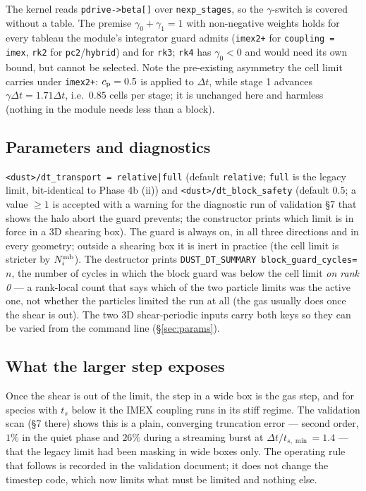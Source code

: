 \documentclass[11pt]{article}
\newcommand{\code}[1]{\texttt{#1}}
\begin{document}
The kernel reads \code{pdrive->beta[]} over \code{nexp\_stages}, so the $\gamma$-switch
is covered without a table. The premise $\gamma_0 + \gamma_1 = 1$ with non-negative
weights holds for every tableau the module's integrator guard admits (\code{imex2+} for
\code{coupling = imex}, \code{rk2} for \code{pc2}/\code{hybrid}) and for \code{rk3};
\code{rk4} has $\gamma_0 < 0$ and would need its own bound, but cannot be selected. Note the pre-existing asymmetry the
cell limit carries under \code{imex2+}: $c_{\rm p} = 0.5$ is applied to $\Delta t$, while
stage 1 advances $\gamma\Delta t = 1.71\Delta t$, i.e.\ $0.85$ cells per stage; it is
unchanged here and harmless (nothing in the module needs less than a block).

\subsection{Parameters and diagnostics}

\code{<dust>/dt\_transport = relative|full} (default \code{relative}; \code{full} is
the legacy limit, bit-identical to Phase 4b (ii)) and \code{<dust>/dt\_block\_safety}
(default $0.5$; a value $\ge 1$ is accepted with a warning for the diagnostic run of
validation \S7 that shows the halo abort the guard prevents; the constructor prints
which limit is in force in a 3D shearing box). The guard is always on, in all three
directions and in every geometry; outside a shearing box it is inert in practice
(the cell limit is stricter by $N_i^{\rm mb}$). The destructor prints
\code{DUST\_DT\_SUMMARY block\_guard\_cycles=$n$}, the number of cycles in which the
block guard was below the cell limit \emph{on rank 0} --- a rank-local count that says
which of the two particle limits was the active one, not whether the particles limited
the run at all (the gas usually does once the shear is out). The two 3D
shear-periodic inputs carry both keys so they can be varied from the command line
(\S\ref{sec:params}).

\subsection{What the larger step exposes}

Once the shear is out of the limit, the step in a wide box is the gas step, and for
species with $t_s$ below it the IMEX coupling runs in its stiff regime. The validation
scan (\S7 there) shows this is a plain, converging truncation error --- second order,
$1\%$ in the quiet phase and $26\%$ during a streaming burst at $\Delta t/t_{s,\min}
= 1.4$ --- that the legacy limit had been masking in wide boxes only. The operating
rule that follows is recorded in the validation document; it does not change the
timestep code, which now limits what must be limited and nothing else.
\end{document}
